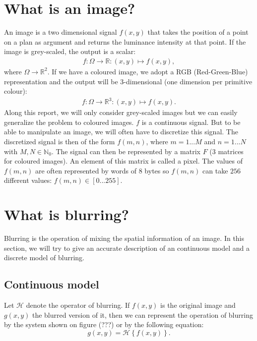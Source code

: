 \section{What is an image?}

An image is a two dimensional signal $f(x,y)$ that takes the position of a point on a plan as argument and returns the luminance intensity at that point. If the image is grey-scaled, the output is a scalar:
\begin{eqnarray}
f:\Omega \rightarrow \mathbb{R}: (x,y) \mapsto f(x,y),
\end{eqnarray}
where $\Omega \rightarrow \mathbb{R}^2$. If we have a coloured image, we adopt a RGB (Red-Green-Blue) representation and the output will be 3-dimensional (one dimension per primitive colour):
\begin{eqnarray}
f:\Omega \rightarrow \mathbb{R}^3 : (x,y) \mapsto f(x,y).
\end{eqnarray}
Along this report, we will only consider grey-scaled images but we can easily generalize the problem to coloured images. $f$ is a continuous signal. But to be able to manipulate an image, we will often have to discretize this signal. The discretized signal is then of the form $f(m,n)$, where $m=1...M$ and $n=1...N$ with $M,N \in \mathbb{N}_0$. The signal can then be represented by a matrix $F$ (3 matrices for coloured images). An element  of this matrix is called a pixel. The values of $f(m,n)$ are often represented by words of $8$ bytes so $f(m,n)$ can take $256$ different values: $f(m,n) \in \left[0...255\right]$.

\section{What is blurring?}

Blurring is the operation of mixing the spatial information of an image. In this section, we will try to give an accurate description of an continuous model and a discrete model of blurring.

\subsection{Continuous model}

Let $\mathcal{H}$ denote the operator of blurring. If $f(x,y)$ is the original image and $g(x,y)$ the blurred version of it, then we can represent the operation of blurring by the system shown on figure (???) or by the following equation: %
\begin{equation}
g(x,y) = \mathcal{H}\left\lbrace f(x,y) \right\rbrace.
\end{equation}

